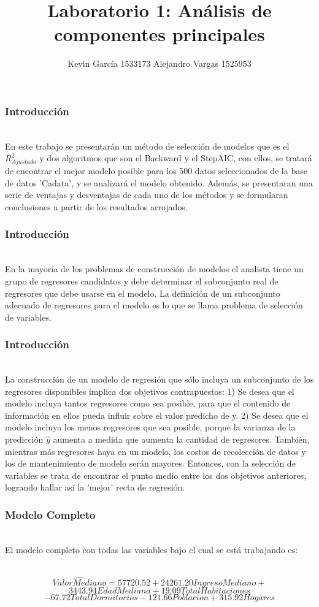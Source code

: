 \documentclass[12pt]{beamer}
\author[Kevin García - Alejandro Vargas]{Kevin García 1533173 \newline Alejandro Vargas 1525953}
\title[Análisis de componentes principales]{Laboratorio 1: Análisis de componentes principales}
\begin{document}
\justify
\begin{frame}
\titlepage
\end{frame}

\begin{frame}
\frametitle{Introducción}
~\\En este trabajo se presentarán un método de selección de modelos que es el $R^2_{Ajustado}$ y dos algoritmos que son el Backward y el StepAIC, con ellos, se tratará de encontrar el mejor modelo posible para los 500 datos seleccionados de la base de datos 'Cadata', y se analizará el modelo obtenido. Además, se presentaran una serie de ventajas y desventajas de cada uno de los métodos y se formularan conclusiones a partir de los resultados arrojados.
\end{frame}

\begin{frame}
\frametitle{Introducción}
~\\En la mayoría de los problemas de construcción de modelos el analista tiene un grupo de regresores candidatos y debe determinar el subconjunto real de
regresores que debe usarse en el modelo. La definición de un subconjunto adecuado de regresores para el modelo es lo que se llama problema de selección de variables.
\end{frame}

\begin{frame}
\frametitle{Introducción}
~\\La construcción de un modelo de regresión que sólo incluya un subconjunto de los regresores disponibles implica dos objetivos contrapuestos: 1) Se desea que el modelo incluya tantos regresores como sea posible, para que el contenido de información en ellos pueda influir sobre el valor predicho de y. 2) Se desea que el modelo incluya los menos regresores que sea posible, porque la varianza de la predicción $\hat{y}$ aumenta a medida que aumenta la cantidad de regresores. También, mientras más regresores haya en un modelo, los costos de recolección de datos y los de mantenimiento de modelo serán mayores. Entonces, con la selección de variables se trata de encontrar el punto medio entre los dos objetivos anteriores, logrando hallar así la 'mejor' recta de regresión.
\end{frame}

\begin{frame}
\frametitle{Modelo Completo}
~\\El modelo completo con todas las variables bajo el cual se está trabajando es:

~\\$$\hat{ValorMediano} = 57720.52 + 24261.20IngresoMediano +$$
$$3443.94EdadMediana + 19.09TotalHabitaciones$$
$$ - 67.72TotalDormitorios - 121.66Poblacion +315.92Hogares $$
\end{frame}
\end{document}
